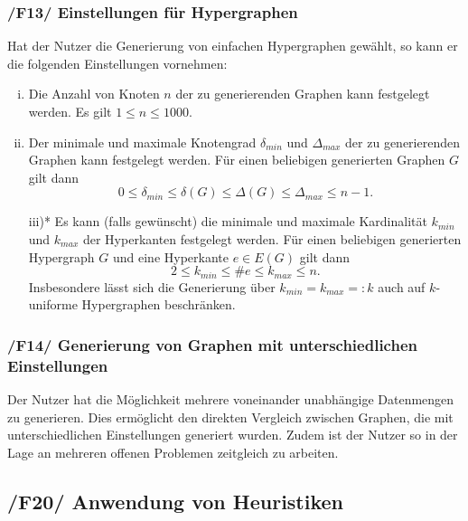 \documentclass{article}
\begin{document}
	\subsubsection*{/F13/ Einstellungen für Hypergraphen} \label{f13} 
	Hat der Nutzer die Generierung von einfachen Hypergraphen gewählt, so kann er die folgenden Einstellungen vornehmen:
	\begin{enumerate}[i)]
		\item{Die Anzahl von Knoten $n$ der zu generierenden Graphen kann festgelegt werden. Es gilt $1 \leq n \leq 1000$.}
		\item{Der minimale und maximale Knotengrad $\delta_{min}$ und $\Delta_{max}$ der zu generierenden Graphen kann festgelegt werden. Für einen beliebigen generierten Graphen $G$ gilt dann $$0 \leq \delta_{min} \leq \delta(G) \leq \Delta(G) \leq \Delta_{max} \leq n-1.$$}
		\item[iii)*]{Es kann (falls gewünscht) die minimale und maximale Kardinalität $k_{min}$ und $k_{max}$ der Hyperkanten festgelegt werden. Für einen beliebigen generierten Hypergraph $G$ und eine Hyperkante $e \in E(G)$ gilt dann $$2 \leq k_{min} \leq \# e \leq k_{max} \leq n.$$ Insbesondere lässt sich die Generierung über $k_{min} = k_{max} =: k$ auch auf $k$-uniforme Hypergraphen beschränken.}
	\end{enumerate}
	
	\subsubsection*{/F14/ Generierung von Graphen mit unterschiedlichen Einstellungen} \label{f14} 
	Der Nutzer hat die Möglichkeit mehrere voneinander unabhängige Datenmengen zu generieren. Dies ermöglicht den direkten Vergleich zwischen Graphen, die mit unterschiedlichen Einstellungen generiert wurden. Zudem ist der Nutzer so in der Lage an mehreren offenen Problemen zeitgleich zu arbeiten.
	
	
	\newpage
	
	\subsection*{/F20/ Anwendung von Heuristiken} \label{f20} 
	
\end{document}
